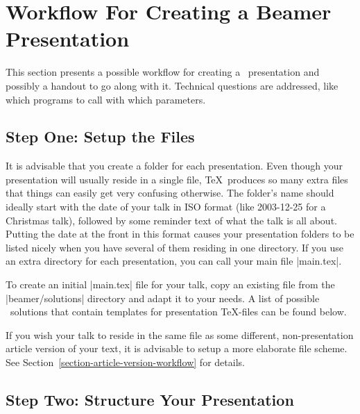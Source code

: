 %
%
%


\section{Workflow For Creating a Beamer Presentation}
\label{section-workflow}

This section presents a possible workflow for creating a \beamer\ presentation and possibly a handout to go along with it. Technical questions are addressed, like which programs to call with which parameters.


\subsection{Step One: Setup the Files}

\beamernote
It is advisable that you create a folder for each presentation. Even though your presentation will usually reside in a single file, \TeX\ produces so many extra files that things can easily get very confusing otherwise. The folder's name should ideally start with the date of your talk in ISO format (like 2003-12-25 for a Christmas talk), followed by some reminder text of what the talk is all about. Putting the date at the front in this format causes your presentation folders to be listed nicely when you have several of them residing in one directory. If you use an extra directory for each presentation, you can call your main file |main.tex|.

To create an initial |main.tex| file for your talk, copy an existing file from the |beamer/solutions| directory and adapt it to your needs. A list of possible \beamer\ solutions that contain templates for presentation \TeX-files can be found below.

If you wish your talk to reside in the same file as some different, non-presentation article version of your text, it is advisable to setup a more elaborate file scheme. See Section~\ref{section-article-version-workflow} for details.

\subsection{Step Two: Structure Your Presentation}

